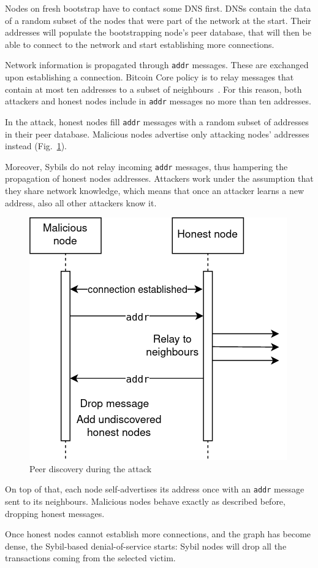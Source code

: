 Nodes on fresh bootstrap have to contact some DNS first. DNSs contain the data of a random subset of the nodes that were part of the network at the start. Their addresses will populate the bootstrapping node's peer database, that will then be able to connect to the network and start establishing more connections.

Network information is propagated through \texttt{addr} messages. These are exchanged upon establishing a connection. Bitcoin Core policy is to relay messages that contain at most ten addresses to a subset of neighbours~\cite{btccode}. For this reason, both attackers and honest nodes include in \texttt{addr} messages no more than ten addresses.

In the attack, honest nodes fill \texttt{addr} messages with a random subset of addresses in their peer database. Malicious nodes advertise only attacking nodes' addresses instead (Fig.~\ref{fig:atkadrr}).

Moreover, Sybils do not relay incoming \texttt{addr} messages, thus hampering the propagation of honest nodes addresses. Attackers work under the assumption that they share network knowledge, which means that once an attacker learns a new address, also all other attackers know it.

\begin{figure}[h]
	\includegraphics[width=.5\textwidth]{pict/atkaddr.png}
	\centering
	\caption{Peer discovery during the attack}
	\label{fig:atkadrr}
\end{figure}

On top of that, each node self-advertises its address once with an \texttt{addr} message sent to its neighbours. Malicious nodes behave exactly as described before, dropping honest messages.

Once honest nodes cannot establish more connections, and the graph has become dense, the Sybil-based denial-of-service starts: Sybil nodes will drop all the transactions coming from the selected victim.

